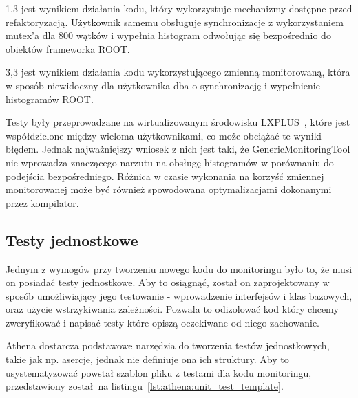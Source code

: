 1,3 jest wynikiem działania kodu, który wykorzystuje mechanizmy dostępne przed refaktoryzacją.
Użytkownik samemu obsługuje synchronizacje z wykorzystaniem mutex'a dla 800 wątków i wypełnia histogram odwołując się bezpośrednio do obiektów frameworka ROOT.

3,3 jest wynikiem działania kodu wykorzystującego zmienną monitorowaną, która w sposób niewidoczny dla użytkownika dba o synchronizację i wypełnienie histogramów ROOT. 

Testy były przeprowadzane na wirtualizowanym środowisku LXPLUS~\cite{cern-lxplus}, które jest współdzielone między wieloma użytkownikami, co może obciążać te wyniki błędem. 
Jednak najważniejszy wniosek z nich jest taki, że GenericMonitoringTool nie wprowadza znaczącego narzutu na obsługę histogramów w porównaniu do podejścia bezpośredniego.
Różnica w czasie wykonania na korzyść zmiennej monitorowanej może być również spowodowana optymalizacjami dokonanymi przez kompilator. 

\subsection{Testy jednostkowe}
Jednym z wymogów przy tworzeniu nowego kodu do monitoringu było to, że musi on posiadać testy jednostkowe.
Aby to osiągnąć, został on zaprojektowany w sposób umożliwiający jego testowanie - wprowadzenie interfejsów i klas bazowych, oraz użycie wstrzykiwania zależności.
Pozwala to odizolować kod który chcemy zweryfikować i napisać testy które opiszą oczekiwane od niego zachowanie.

Athena dostarcza podstawowe narzędzia do tworzenia testów jednostkowych, takie jak np. asercje, jednak nie definiuje ona ich struktury.
Aby to usystematyzować powstał szablon pliku z testami dla kodu monitoringu, przedstawiony został na listingu~\ref{lst:athena:unit_test_template}.



